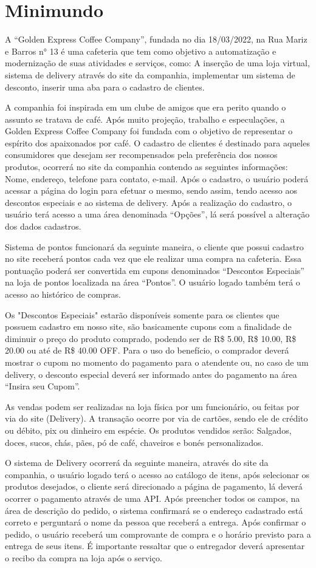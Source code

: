 \section{Minimundo}
A “Golden Express Coffee Company”, fundada no dia 18/03/2022, na Rua Mariz e Barros n° 13 é uma cafeteria que tem como objetivo a automatização e modernização de suas atividades e serviços, como: A inserção de uma loja virtual, sistema de delivery através do site da companhia, implementar um sistema de desconto, inserir uma aba para o cadastro de clientes.

A companhia foi inspirada em um clube de amigos que era perito quando o assunto se tratava de café. Após muito projeção, trabalho e especulações, a Golden Express Coffee Company foi fundada com o objetivo de representar o espírito dos apaixonados por café.
O cadastro de clientes é destinado para aqueles consumidores que desejam ser recompensados pela preferência dos nossos produtos, ocorrerá no site da companhia contendo as seguintes informações: Nome, endereço, telefone para contato, e-mail. Após o cadastro, o usuário poderá acessar a página do login para efetuar o mesmo, sendo assim, tendo acesso aos descontos especiais e ao sistema de delivery. Após a realização do cadastro, o usuário terá acesso a uma área denominada “Opções”, lá será possível a alteração dos dados cadastros.

Sistema de pontos funcionará da seguinte maneira, o cliente que possui cadastro no site receberá pontos cada vez que ele realizar uma compra na cafeteria. Essa pontuação poderá ser convertida em cupons denominados “Descontos Especiais” na loja de pontos localizada na área “Pontos”. O usuário logado também terá o acesso ao histórico de compras.

Os "Descontos Especiais" estarão disponíveis somente para os clientes que possuem cadastro em nosso site, são basicamente cupons com a finalidade de diminuir o preço do produto comprado, podendo ser de R\$  5.00, R\$ 10.00, R\$ 20.00 ou até de R\$ 40.00 OFF. Para o uso do benefício, o comprador deverá mostrar o cupom no momento do pagamento para o atendente ou, no caso de um delivery, o desconto especial deverá ser informado antes do pagamento na área “Insira seu Cupom”.

As vendas podem ser realizadas na loja física por um funcionário, ou feitas por via do site (Delivery). A transação ocorre por via de cartões, sendo ele de crédito ou débito, pix ou dinheiro em espécie. Os produtos vendidos serão: Salgados, doces, sucos, chás, pães, pó de café, chaveiros e bonés personalizados.

O sistema de Delivery ocorrerá da seguinte maneira, através do site da companhia, o usuário logado terá o acesso ao catálogo de itens, após selecionar os produtos desejados, o cliente será direcionado a página de pagamento, lá deverá ocorrer o pagamento através de uma API. Após preencher todos os campos, na área de descrição do pedido, o sistema confirmará se o endereço cadastrado está correto e perguntará o nome da pessoa que receberá a entrega. Após confirmar o pedido, o usuário receberá um comprovante de compra e o horário previsto para a entrega de seus itens. É importante ressaltar que o entregador deverá apresentar o recibo da compra na loja após o serviço.